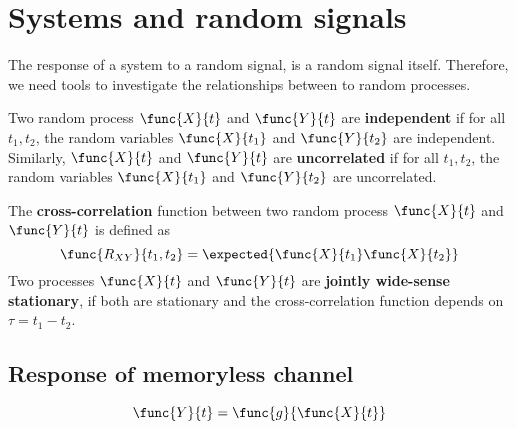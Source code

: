 \section{Systems and random signals}
The response of a system to a random signal, is a random signal itself. Therefore, we need tools to investigate the relationships between to random processes.
\begin{definition}
    Two random process \(\func{X}{t}\) and \(\func{Y}{t}\) are \textbf{independent} if for all \(t_1,t_2\), the random variables \(\func{X}{t_1}\) and \(\func{Y}{t_2}\) are independent. Similarly, \(\func{X}{t}\) and \(\func{Y}{t}\) are \textbf{uncorrelated} if for all \(t_1,t_2\), the random variables \(\func{X}{t_1}\) and \(\func{Y}{t_2}\) are uncorrelated.
\end{definition}
\begin{definition}
    The \textbf{cross-correlation} function between two random process \(\func{X}{t}\) and  \(\func{Y}{t}\) is defined as 
    \begin{equation*}
        \func{R_{XY}}{t_1,t_2} = \expected{\func{X}{t_1} \func{X}{t_2}}
    \end{equation*}
    Two processes \(\func{X}{t}\) and  \(\func{Y}{t}\) are \textbf{jointly wide-sense stationary}, if both are stationary and the cross-correlation function depends on \(\tau = t_1 - t_2\).
\end{definition}
\subsection{Response of memoryless channel}
\begin{equation*}
    \func{Y}{t}= \func{g}{\func{X}{t}}
\end{equation*}
